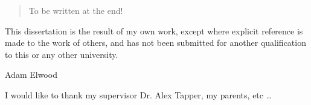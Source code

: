 
\begin{abstract}%
  To be written at the end!
\end{abstract}


\begin{declaration}
  This dissertation is the result of my own work, except where explicit
  reference is made to the work of others, and has not been submitted
  for another qualification to this or any other university.
  \vspace*{1cm}
  \begin{flushright}
    Adam Elwood
  \end{flushright}
\end{declaration}


\begin{acknowledgements}
  I would like to thank my supervisor Dr. Alex Tapper, my parents, etc
  \dots
\end{acknowledgements}


%
%


